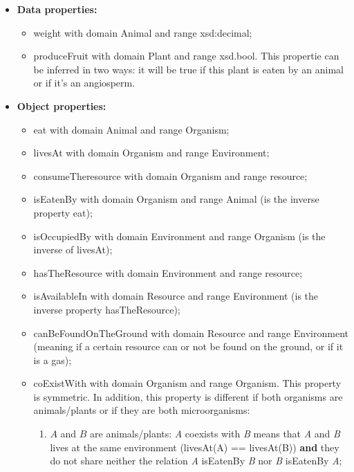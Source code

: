 \begin{itemize}
    \item \textbf{Data properties:}
    \begin{itemize}
        \item weight with domain Animal and range xsd:decimal;

        \item produceFruit with domain Plant and range xsd.bool. This propertie can be inferred in two ways: it will be true if this plant is eaten by an animal or if it's an angiosperm.
    \end{itemize}

    \item \textbf{Object properties:}
    \begin{itemize}
        \item eat with domain Animal and range Organism;

        \item livesAt with domain Organism and range Environment;

        \item consumeTheresource with domain Organism and range resource;

        \item isEatenBy with domain Organism and range Animal (is the inverse property eat);

        \item isOccupiedBy with domain Environment and range Organism (is the inverse of livesAt);

        \item hasTheResource with domain Environment and range resource;

        \item isAvailableIn with domain Resource and range Environment (is the inverse property hasTheResource);

        \item canBeFoundOnTheGround with domain Resource and range Environment (meaning if a certain resource can or not be found on the ground, or if it is a gas);

        \item coExistWith with domain Organism and range Organism. This property is symmetric. In addition, this property is different if both organisms are animals/plants or if they are both microorganisms:
        \begin{enumerate}
            \item $A$ and $B$ are animals/plants: \textit{A} coexists with \textit{B} means that \textit{A} and \textit{B} lives at the same environment (livesAt(A) == livesAt(B)) \textbf{and} they do not share neither the relation \textit{A} isEatenBy \textit{B} nor \textit{B} isEatenBy \textit{A};


\end{enumerate}
\end{itemize}
\end{itemize}
